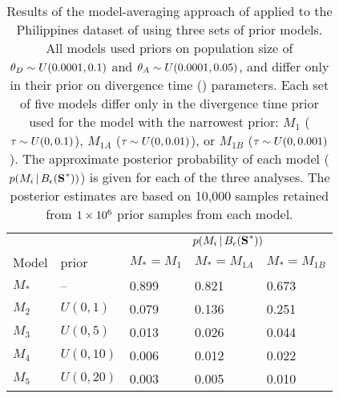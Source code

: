 \documentclass[letterpaper,12pt]{article}
\begin{document}
\begin{table}[htbp]
    \sffamily
    \addtolength{\tabcolsep}{-0.08cm}
    \caption{Results of the model-averaging approach of \citet{Hickerson2013}
        applied to the Philippines dataset of \citet{Oaks2012} using three sets
        of prior models. All models used priors on population size of
        $\meanDescendantTheta{} \sim U(0.0001,0.1)$ and $\ancestralTheta{} \sim
        U(0.0001, 0.05)$, and differ only in their prior on divergence time
        (\divt{}) parameters.  Each set of five models differ only in the
        divergence time prior used for the model with the narrowest prior:
        $M_1$ ($\tau_{} \sim U(0, 0.1)$), $M_{1A}$ ($\tau_{} \sim U(0, 0.01)$),
        or $M_{1B}$ ($\tau_{} \sim U(0, 0.001)$). The approximate posterior
        probability of each model ($p(M_i \given \ssSpace)$) is given for each
        of the three analyses.  The posterior estimates are based on 10,000
        samples retained from $1\times 10^{6}$ prior samples
    from each model.}
    \centering
    \begin{tabular}{ l l l l l }
        \toprule
        & & \multicolumn{3}{c}{$p(M_i \given \ssSpace)$} \\
        \cmidrule(){3-5}
        Model & \divt{} prior & $M_{*}=M_1$ & $M_{*}=M_{1A}$ & $M_{*}=M_{1B}$ \\
        \midrule
        $M_*$ & --        & 0.899 & 0.821 & 0.673 \\
        $M_2$ & $U(0,1)$  & 0.079 & 0.136 & 0.251 \\
        $M_3$ & $U(0,5)$  & 0.013 & 0.026 & 0.044 \\
        $M_4$ & $U(0,10)$ & 0.006 & 0.012 & 0.022 \\
        $M_5$ & $U(0,20)$ & 0.003 & 0.005 & 0.010 \\
        \bottomrule
    \end{tabular}
    \label{tabModelChoiceEmpirical}
\end{table}

\clearpage

\newpage

\end{document}
